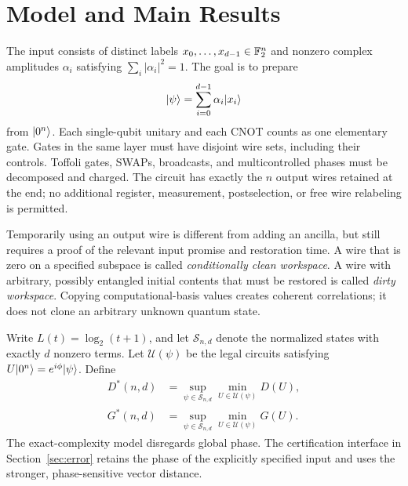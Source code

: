 \section{Model and Main Results}\label{sec:model}
The input consists of distinct labels $x_0,\ldots,x_{d-1}\in\mathbb F_2^n$ and nonzero complex amplitudes $\alpha_i$ satisfying $\sum_i|\alpha_i|^2=1$. The goal is to prepare
\begin{equation}\label{eq:target}
\lvert \psi\rangle=\sum_{i=0}^{d-1}\alpha_i\lvert x_i\rangle
\end{equation}
from $\lvert 0^n\rangle$. Each single-qubit unitary and each CNOT counts as one elementary gate. Gates in the same layer must have disjoint wire sets, including their controls. Toffoli gates, SWAPs, broadcasts, and multicontrolled phases must be decomposed and charged. The circuit has exactly the $n$ output wires retained at the end; no additional register, measurement, postselection, or free wire relabeling is permitted.

Temporarily using an output wire is different from adding an ancilla, but still requires a proof of the relevant input promise and restoration time. A wire that is zero on a specified subspace is called \emph{conditionally clean workspace}. A wire with arbitrary, possibly entangled initial contents that must be restored is called \emph{dirty workspace}. Copying computational-basis values creates coherent correlations; it does not clone an arbitrary unknown quantum state.

Write $L(t)=\log_2(t+1)$, and let $\mathcal S_{n,d}$ denote the normalized states with exactly $d$ nonzero terms. Let $\mathcal U(\psi)$ be the legal circuits satisfying $U\lvert 0^n\rangle=e^{i\phi}\lvert \psi\rangle$. Define
\begin{equation}
\begin{aligned}
D^*(n,d)&=\sup_{\psi\in\mathcal S_{n,d}}\min_{U\in\mathcal U(\psi)}D(U),\\
G^*(n,d)&=\sup_{\psi\in\mathcal S_{n,d}}\min_{U\in\mathcal U(\psi)}G(U).
\end{aligned}
\end{equation}
The exact-complexity model disregards global phase. The certification interface in Section~\ref{sec:error} retains the phase of the explicitly specified input and uses the stronger, phase-sensitive vector distance.


